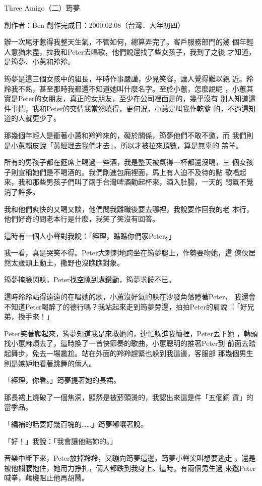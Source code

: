 



Three Amigo（二）筠夢

創作者：Ben
創作完成日：2000.02.08（台灣．大年初四）


辦一次尾牙惹得我整天生氣，不管如何，總算弄完了。客戶服務部門的幾
個年輕人意猶未盡，拉我和Peter去唱歌，他們說還找了些女孩子，我到了之後
才知道，是筠夢、小蕙和羚羚。

筠夢是這三個女孩中的組長，平時作事嚴謹，少見笑容，讓人覺得難以親
近。羚羚我不熟，甚至那時我都還不知道她叫什麼名字。至於小蕙，怎麼說呢
，小蕙其實是Peter的女朋友，真正的女朋友，至少在公司裡面是的，幾乎沒有
別人知道這件事情，我和Peter的交情我當然曉得，更何況，小蕙是叫我作乾爹
的，不過這知道的人就更少了。

那幾個年輕人是衝著小蕙和羚羚來的，礙於關係，筠夢他們不敢不邀，而
我們則是小蕙賴皮說「黃經理去我們才去」，所以才被拉來頂數，算是無辜的
羔羊。

所有的男孩子都在筵席上喝過一些酒，我是整天被氣得一杯都還沒喝，三
個女孩子則宣稱她們是不喝酒的。我們剛進包廂裡面，馬上有人迫不及待的點
歌唱起來，我和那些男孩子們叫了兩手台灣啤酒勸起杯來，酒入肚腸，一天的
悶氣不覺消了許多。

我和他們爽快的又喝又談，他們問我離職後要去哪裡，我說要作回我的老
本行，他們好奇的問老本行是什麼，我笑了笑沒有回答。

這時有一個人小聲對我說：「經理，瞧瞧你們家Peter。」

我一看，真是哭笑不得。Peter大剌剌地跨坐在筠夢腿上，作勢要吻她，這
傢伙居然太歲頭上動土，撒野也沒瞧瞧對象。

筠夢掩臉閃躲，Peter找空隙到處鑽動，筠夢求饒不已。

這時羚羚站得遠遠的在唱她的歌，小蕙沒好氣的躲在沙發角落瞪著Peter，
我還會不知道Peter喝醉了的德行嗎？我站起來走到筠夢旁邊，拍拍Peter的肩說
：「好兄弟，換手來！」

Peter笑著爬起來，筠夢知道我是來救她的，連忙躲進我懷裡，Peter丟下她
，轉頭找小蕙麻煩去了，這時換了一首快節奏的歌曲，小蕙聰明的推著Peter到
前面去踏起舞步，免去一場尷尬。站在外面的羚羚趕緊也躲到我這邊，客服部
那幾個男生則是嫉妒地看著跳舞的倆人。

「經理，你看。」筠夢提著她的長裙。

那長裙上燒破了一個焦洞，顯然是被菸頭燙的，我認出來這是件「五個銅
貨」的當季品。

「繡補的話要好幾百塊的……」筠夢嘟嚷著說。

「好！」我說：「我會讓他賠妳的。」

音樂中斷下來，Peter放掉羚羚，又蹦向筠夢這邊，筠夢小聲尖叫想要逃走
，還是被他欄腰抱住，她用力掙扎，倆人都跌到我身上。這時，有兩個男生過
來邀Peter喊拳，藉機阻止他再胡鬧。


